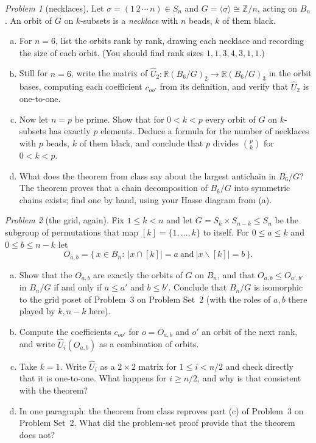 \documentclass[11pt,twoside]{amsart}
\theoremstyle{plain}
\theoremstyle{remark}
\newtheorem{prob}{Problem}
\theoremstyle{definition}
\newcommand{\RR}{\mathbb{R}}
\newcommand{\ZZ}{\mathbb{Z}}
\newcommand{\Uh}{\widehat U}
\begin{document}
\begin{prob}[necklaces]
Let $\sigma=(1\,2\,\cdots\,n)\in S_n$ and $G=\langle\sigma\rangle\cong\ZZ/n$, acting on $B_n$.
An orbit of $G$ on $k$-subsets is a \emph{necklace} with $n$ beads, $k$ of them black.
\begin{enumerate}[(a)]
\item For $n=6$, list the orbits rank by rank, drawing each necklace and recording the size of
each orbit. (You should find rank sizes $1,1,3,4,3,1,1$.)
\item Still for $n=6$, write the matrix of $\Uh_2\colon\RR(B_6/G)_2\to\RR(B_6/G)_3$ in the
orbit bases, computing each coefficient $c_{oo'}$ from its definition, and verify that
$\Uh_2$ is one-to-one.
\item Now let $n=p$ be prime. Show that for $0<k<p$ every orbit of $G$ on $k$-subsets has
exactly $p$ elements. Deduce a formula for the number of necklaces with $p$ beads, $k$ of them
black, and conclude that $p$ divides $\binom pk$ for $0<k<p$.
\item What does the theorem from class say about the largest antichain in $B_6/G$? The
theorem proves that a chain decomposition of $B_6/G$ into symmetric chains exists; find one by
hand, using your Hasse diagram from (a).
\end{enumerate}
\end{prob}

\begin{prob}[the grid, again]
Fix $1\le k<n$ and let $G=S_k\times S_{n-k}\le S_n$ be the subgroup of permutations that map
$[k]=\{1,\dots,k\}$ to itself. For $0\le a\le k$ and $0\le b\le n-k$ let
\[
O_{a,b}=\bigl\{\,x\in B_n:\ |x\cap[k]|=a\ \text{and}\ |x\smallsetminus[k]|=b\,\bigr\}.
\]
\begin{enumerate}[(a)]
\item Show that the $O_{a,b}$ are exactly the orbits of $G$ on $B_n$, and that
$O_{a,b}\le O_{a',b'}$ in $B_n/G$ if and only if $a\le a'$ and $b\le b'$. Conclude that
$B_n/G$ is isomorphic to the grid poset of Problem~3 on Problem Set~2 (with the roles of
$a,b$ there played by $k,n-k$ here).
\item Compute the coefficients $c_{oo'}$ for $o=O_{a,b}$ and $o'$ an orbit of the next
rank, and write $\Uh_i(O_{a,b})$ as a combination of orbits.
\item Take $k=1$. Write $\Uh_i$ as a $2\times2$ matrix for $1\le i<n/2$ and check directly
that it is one-to-one. What happens for $i\ge n/2$, and why is that consistent with the
theorem?
\item In one paragraph: the theorem from class reproves part (c) of Problem~3 on Problem
Set~2. What did the problem-set proof provide that the theorem does not?
\end{enumerate}
\end{prob}
\end{document}
